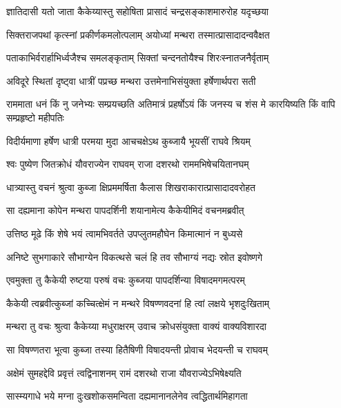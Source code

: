 \twolineshloka
{ज्ञातिदासी यतो जाता कैकेय्यास्तु सहोषिता}
{प्रासादं चन्द्रसङ्काशमारुरोह यदृच्छया} %

\twolineshloka
{सिक्तराजपथां कृत्स्नां प्रकीर्णकमलोत्पलाम्}
{अयोध्यां मन्थरा तस्मात्प्रासादादन्ववैक्षत} %

\twolineshloka
{पताकाभिर्वरार्हाभिर्ध्वजैश्च समलङ्कृताम्}
{सिक्तां चन्दनतोयैश्च शिरःस्नातजनैर्वृताम्} %

\twolineshloka
{अविदूरे स्थितां दृष्ट्वा धात्रीं पप्रच्छ मन्थरा}
{उत्तमेनाभिसंयुक्ता हर्षेणार्थपरा सती} %

\threelineshloka
{राममाता धनं किं नु जनेभ्यः सम्प्रयच्छति}
{अतिमात्रं प्रहर्षोऽयं किं जनस्य च शंस मे}
{कारयिष्यति किं वापि सम्प्रहृष्टो महीपतिः} %

\twolineshloka
{विदीर्यमाणा हर्षेण धात्री परमया मुदा}
{आचचक्षेऽथ कुब्जायै भूयसीं राघवे श्रियम्} %

\twolineshloka
{श्वः पुष्येण जितक्रोधं यौवराज्येन राघवम्}
{राजा दशरथो राममभिषेचयितानघम्} %

\twolineshloka
{धात्र्यास्तु वचनं श्रुत्वा कुब्जा क्षिप्रममर्षिता}
{कैलास शिखराकारात्प्रासादादवरोहत} %

\twolineshloka
{सा दह्यमाना कोपेन मन्थरा पापदर्शिनी}
{शयानामेत्य कैकेयीमिदं वचनमब्रवीत्} %

\twolineshloka
{उत्तिष्ठ मूढे किं शेषे भयं त्वामभिवर्तते}
{उपप्लुतमहौघेन किमात्मानं न बुध्यसे} %

\twolineshloka
{अनिष्टे सुभगाकारे सौभाग्येन विकत्थसे}
{चलं हि तव सौभाग्यं नद्यः स्रोत इवोष्णगे} %

\twolineshloka
{एवमुक्ता तु कैकेयी रुष्टया परुषं वचः}
{कुब्जया पापदर्शिन्या विषादमगमत्परम्} %

\twolineshloka
{कैकेयी त्वब्रवीत्कुब्जां कच्चित्क्षेमं न मन्थरे}
{विषण्णवदनां हि त्वां लक्षये भृशदुःखिताम्} %

\twolineshloka
{मन्थरा तु वचः श्रुत्वा कैकेय्या मधुराक्षरम्}
{उवाच क्रोधसंयुक्ता वाक्यं वाक्यविशारदा} %

\twolineshloka
{सा विषण्णतरा भूत्वा कुब्जा तस्या हितैषिणी}
{विषादयन्ती प्रोवाच भेदयन्ती च राघवम्} %

\twolineshloka
{अक्षेमं सुमहद्देवि प्रवृत्तं त्वद्विनाशनम्}
{रामं दशरथो राजा यौवराज्येऽभिषेक्ष्यति} %

\twolineshloka
{सास्म्यगाधे भये मग्ना दुःखशोकसमन्विता}
{दह्यमानानलेनेव त्वद्धितार्थमिहागता} %

